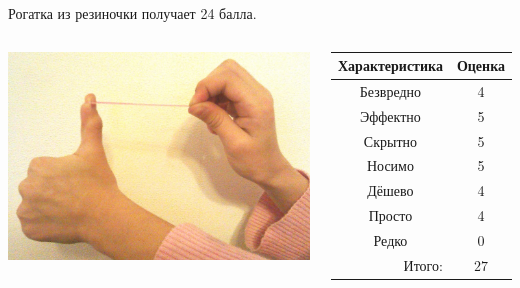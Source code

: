 Рогатка из резиночки получает 24 балла.

\begin{frame} %
    \begin{columns}
            \begin{center}
                \includegraphics[width=\textwidth]{fig/elastic}
            \end{center}
            
            \begin{center}
                \begin{tabular}{c|c}
                    \hline\hline
                    Характеристика              & Оценка\\ \hline\hline
                    Безвредно                   & 4 \\
                    Эффектно                    & 5 \\
                    Скрытно                     & 5 \\
                    Носимо                      & 5 \\
                    Дёшево                      & 4 \\
                    Просто                      & 4 \\ 
                    Редко                       & 0 \\ \hline
                    \multicolumn{1}{r|}{Итого:} & $27$ \\
                \end{tabular}
            \end{center}
    \end{columns}    
\end{frame}

